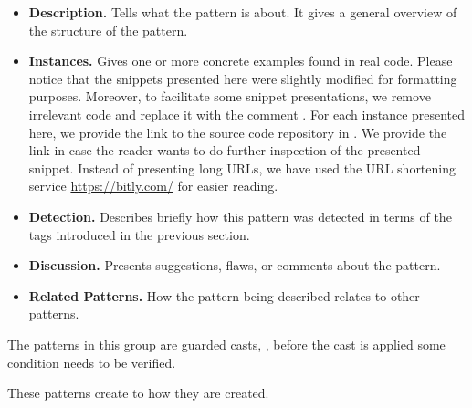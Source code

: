\begin{itemize}
\item \textbf{Description.}
Tells what the pattern is about.
It gives a general overview of the structure of the pattern.
\item \textbf{Instances.}
Gives one or more concrete examples found in real code.
Please notice that the snippets presented here were slightly
modified for formatting purposes.
Moreover, to facilitate some snippet presentations,
we remove irrelevant code and replace it with the
comment \code{// [...]}.
%
%
For each instance presented here, we provide the link to the source code repository in \lgtm{}.
We provide the link in case the reader wants to do further inspection
of the presented snippet.
%
%
Instead of presenting \lgtm{} long URLs,
we have used the URL shortening service \url{https://bitly.com/}
for easier reading.
\item \textbf{Detection.}
Describes briefly how this pattern was detected in terms of the tags introduced in the previous section.
\item \textbf{Discussion.}
Presents suggestions, flaws, or comments about the pattern.
\item \textbf{Related Patterns.}
How the pattern being described relates to other patterns.
%
%
\end{itemize}




The patterns in this group are guarded casts, \ie, before the cast is applied some condition needs to be verified.







These patterns create to how they are created.










